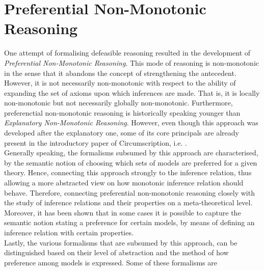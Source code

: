 \documentclass{article}
\begin{document}
\section{Preferential Non-Monotonic Reasoning}
One attempt of formalising defeasible reasoning resulted in the development of \emph{Preferential Non-Monotonic Reasoning}. This mode of reasoning is non-monotonic in the sense that it abandons the concept of  strengthening the antecedent. However, it is not necessarily non-monotonic with respect to the ability of expanding the set of axioms upon which inferences are made. That is, it is locally non-monotonic but not necessarily globally non-monotonic.
Furthermore, preferenctial non-monotonic reasoning is historically speaking younger than \emph{Explanatory Non-Monotonic Reasoning}. However, even though this approach was developed after the explanatory one, some of its core principals are already present in the introductory paper of Circumscription, i.e. \cite{mccarthy1981circumscription} \cite{brewka1997nonmonotonic,bochman2005explanatory}.  \\
 \linebreak
Generally speaking, the formalisms subsumed by this approach are characterised, by the semantic notion of choosing which sets of models are preferred for a given theory.
Hence, connecting this approach strongly to the inference relation, thus allowing a more abstracted view on how monotonic inference relation should behave. Therefore, connecting preferential non-monotonic reasoning closely with the study of inference relations and their properties on a meta-theoretical level. Moreover, it has been shown that in some cases it is possible to capture the semantic notion stating a preference for certain models, by means of defining an inference relation with certain properties.  
\cite{BOCHMAN2007557,brewka1997nonmonotonic}\\

Lastly, the various formalisms that are subsumed by this approach, can be distinguished based on their level of abstraction and the method of how preference among models is expressed. Some of these formalisms are  \cite{brewka1997nonmonotonic}
\end{document}
